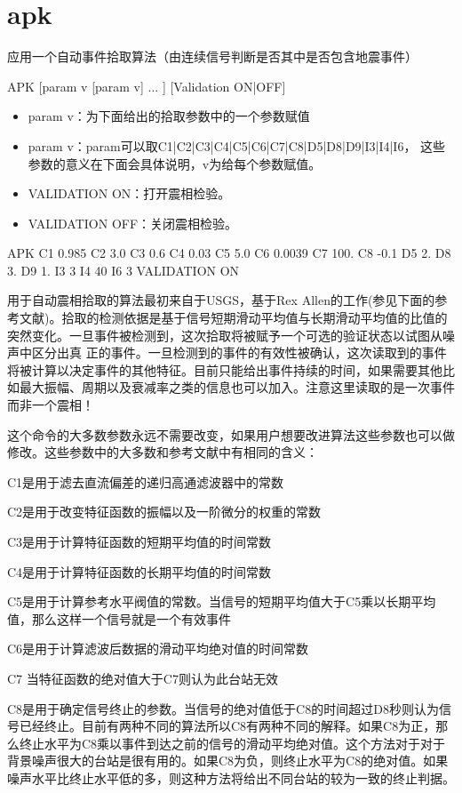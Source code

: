\section{apk}
\label{cmd:apk}

应用一个自动事件拾取算法（由连续信号判断是否其中是否包含地震事件）

APK [param v [param v] ... ] [Validation ON|OFF]

\begin{itemize}
\item param v：为下面给出的拾取参数中的一个参数赋值
\item param v：param可以取C1|C2|C3|C4|C5|C6|C7|C8|D5|D8|D9|I3|I4|I6，
这些参数的意义在下面会具体说明，v为给每个参数赋值。
\item VALIDATION ON：打开震相检验。
\item VALIDATION OFF：关闭震相检验。
\end{itemize}

APK C1 0.985 C2 3.0 C3 0.6 C4 0.03 C5 5.0 C6 0.0039 C7 100. C8 -0.1 D5 		2. D8 3. D9 1. I3 3 I4 40 I6 3 VALIDATION ON

用于自动震相拾取的算法最初来自于USGS，基于Rex Allen的工作(参见下面的参考文献)。拾取的检测依据是基于信号短期滑动平均值与长期滑动平均值的比值的突然变化。一旦事件被检测到，这次拾取将被赋予一个可选的验证状态以试图从噪声中区分出真	正的事件。一旦检测到的事件的有效性被确认，这次读取到的事件将被计算以决定事件的其他特征。目前只能给出事件持续的时间，如果需要其他比如最大振幅、周期以及衰减率之类的信息也可以加入。注意这里读取的是一次事件而非一个震相！

这个命令的大多数参数永远不需要改变，如果用户想要改进算法这些参数也可以做修改。这些参数中的大多数和参考文献中有相同的含义：

C1是用于滤去直流偏差的递归高通滤波器中的常数

C2是用于改变特征函数的振幅以及一阶微分的权重的常数

C3是用于计算特征函数的短期平均值的时间常数

C4是用于计算特征函数的长期平均值的时间常数

C5是用于计算参考水平阀值的常数。当信号的短期平均值大于C5乘以长期平均值，那么这样一个信号就是一个有效事件

C6是用于计算滤波后数据的滑动平均绝对值的时间常数

C7 当特征函数的绝对值大于C7则认为此台站无效

C8是用于确定信号终止的参数。当信号的绝对值低于C8的时间超过D8秒则认为信号已经终止。目前有两种不同的算法所以C8有两种不同的解释。如果C8为正，那么终止水平为C8乘以事件到达之前的信号的滑动平均绝对值。这个方法对于对于背景噪声很大的台站是很有用的。如果C8为负，则终止水平为C8的绝对值。如果噪声水平比终止水平低的多，则这种方法将给出不同台站的较为一致的终止判据。

